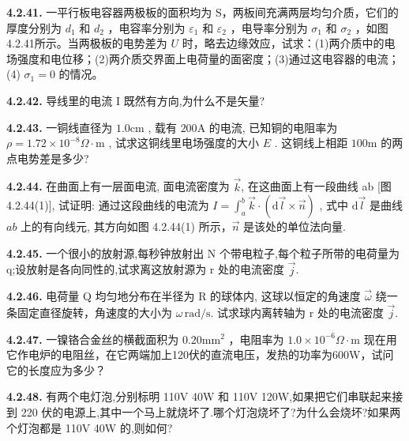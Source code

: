 \vfill
\newpage

\textbf{4.2.41.} 一平行板电容器两极板的面积均为 S，两板间充满两层均匀介质，它们的厚度分别为 $d_{1}$ 和 $d_{2}$ ，电容率分别为 $\varepsilon_{1}$ 和 $\varepsilon_{2}$ ，电导率分别为 $\sigma_{1}$ 和 $\sigma_{2}$ ，如图4.2.41所示。当两极板的电势差为 $U$ 时，略去边缘效应，试求：(1)两介质中的电场强度和电位移；(2)两介质交界面上电荷量的面密度；(3)通过这电容器的电流；(4) $\sigma_{1} = 0$ 的情况。

\begin{center}
\end{center}

\vfill
\newpage

\textbf{4.2.42.} 导线里的电流 I 既然有方向,为什么不是矢量?

\vfill
\newpage

\textbf{4.2.43.} 一铜线直径为 $1.0\mathrm{cm}$ , 载有 $200\mathrm{A}$ 的电流, 已知铜的电阻率为 $\rho = 1.72 \times 10^{-8} \Omega \cdot \mathrm{m}$ , 试求这铜线里电场强度的大小 $E$ . 这铜线上相距 $100\mathrm{m}$ 的两点电势差是多少?

\vfill
\newpage

\textbf{4.2.44.} 在曲面上有一层面电流, 面电流密度为 $\vec{k}$, 在这曲面上有一段曲线 ab [图 4.2.44(1)], 试证明: 通过这段曲线的电流为 $\displaystyle I = \int_{a}^{b} \vec{k} \cdot (\mathrm{d}\vec{l} \times \vec{n})$ , 式中 $\mathrm{d}\vec{l}$ 是曲线 $ab$ 上的有向线元, 其方向如图 4.2.44(1) 所示，$\vec{n}$ 是该处的单位法向量.

\vfill
\newpage

\textbf{4.2.45.} 一个很小的放射源,每秒钟放射出 N 个带电粒子,每个粒子所带的电荷量为 q;设放射是各向同性的,试求离这放射源为 r 处的电流密度 $\vec{j}$.

\vfill
\newpage

\textbf{4.2.46.} 电荷量 Q 均匀地分布在半径为 R 的球体内, 这球以恒定的角速度 $\vec{\omega}$ 绕一条固定直径旋转，角速度的大小为 $\omega\,\mathrm{rad/s}$. 试求球内离转轴为 r 处的电流密度 $\vec{j}$.

\vfill
\newpage

\textbf{4.2.47.} 一镍铬合金丝的横截面积为 $0.20\mathrm{mm}^2$ ，电阻率为 $1.0\times 10^{-6}\Omega \cdot \mathrm{m}$ 现在用它作电炉的电阻丝，在它两端加上120伏的直流电压，发热的功率为600W，试问它的长度应为多少？

\vfill
\newpage

\textbf{4.2.48.} 有两个电灯泡,分别标明 110V 40W 和 110V 120W,如果把它们串联起来接到 220 伏的电源上,其中一个马上就烧坏了.哪个灯泡烧坏了?为什么会烧坏?如果两个灯泡都是 110V 40W 的,则如何?

